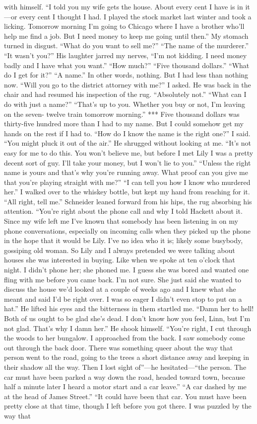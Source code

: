 \documentclass{novel}
\begin{document}
with himself. “I told you my wife gets the house. About every cent I have is in it—or every cent I thought I had. I played the stock market last winter and took a licking. Tomorrow morning I’m going to Chicago where I have a brother who’ll help me find a job. But I need money to keep me going until then.” My stomach turned in disgust. “What do you want to sell me?” “The name of the murderer.” “It wasn’t you?” His laughter jarred my nerves, “I’m not kidding. I need money badly and I have what you want.” “How much?” “Five thousand dollars.” “What do I get for it?” “A name.” In other words, nothing. But I had less than nothing now. “Will you go to the district attorney with me?” I asked. He was back in the chair and had resumed his inspection of the rug. “Absolutely not.” “What can I do with just a name?” “That’s up to you. Whether you buy or not, I’m leaving on the seven- twelve train tomorrow morning.” *** Five thousand dollars was thirty-five hundred more than I had to my name. But I could somehow get my hands on the rest if I had to. “How do I know the name is the right one?” I said. “You might pluck it out of the air.” He shrugged without looking at me. “It’s not easy for me to do this. You won’t believe me, but before I met Lily I was a pretty decent sort of guy. I’ll take your money, but I won’t lie to you.” “Unless the right name is yours and that’s why you’re running away. What proof can you give me that you’re playing straight with me?” “I can tell you how I know who murdered her.” I walked over to the whiskey bottle, but kept my hand from reaching for it. “All right, tell me.” Schneider leaned forward from his hips, the rug absorbing his attention. “You’re right about the phone call and why I told Hackett about it. Since my wife left me I’ve known that somebody has been listening in on my phone conversations, especially on incoming calls when they picked up the phone in the hope that it would be Lily. I’ve no idea who it is; likely some busybody, gossiping old woman. So Lily and I always pretended we were talking about houses she was interested in buying. Like when we spoke at ten o’clock that night. I didn’t phone her; she phoned me. I guess she was bored and wanted one fling with me before you came back. I’m not sure. She just said she wanted to discuss the house we’d looked at a couple of weeks ago and I knew what she meant and said I’d be right over. I was so eager I didn’t even stop to put on a hat.” He lifted his eyes and the bitterness in them startled me. “Damn her to hell! Both of us ought to be glad she’s dead. I don’t know how you feel, Linn, but I’m not glad. That’s why I damn her.” He shook himself. “You’re right, I cut through the woods to her bungalow. I approached from the back. I saw somebody come out through the back door. There was something queer about the way that person went to the road, going to the trees a short distance away and keeping in their shadow all the way. Then I lost sight of”—he hesitated—“the person. The car must have been parked a way down the road, headed toward town, because half a minute later I heard a motor start and a car leave.” “A car dashed by me at the head of James Street.” “It could have been that car. You must have been pretty close at that time, though I left before you got there. I was puzzled by the way that 
\end{document}
